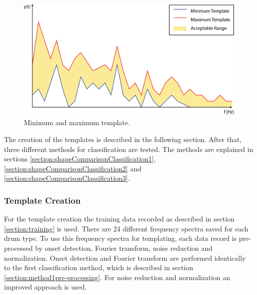 \begin{figure}[htb]
	\centering
	\includegraphics[height=6cm]{images/acceptable_range.png}
	\caption{Minimum and maximum template.}
	\label{fig:templates1}
\end{figure}


The creation of the templates is described in the following section. After that, three different methods for classification are tested. The methods are explained in sections \ref{section:shapeComparisonClassification1}, \ref{section:shapeComparisonClassification2} and \ref{section:shapeComparisonClassification3}.


\subsubsection{Template Creation} \label{section:shapeComparisonTemplates}

For the template creation the training data recorded as described in section \ref{section:training} is used. There are 24 different frequency spectra saved for each drum type. To use this frequency spectra for templating, each data record is pre-processed by onset detection, Fourier transform, noise reduction and normalization. Onset detection and Fourier transform are performed identically to the first classification method, which is described in section \ref{section:method1pre-processing}. For noise reduction and normalization an improved approach is used.

